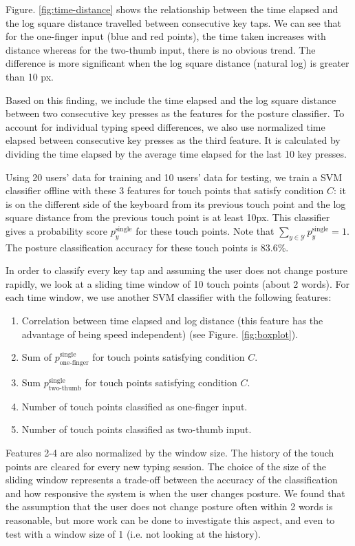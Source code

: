 \documentclass{sigchi}
\begin{document}
Figure. \ref{fig:time-distance} shows the relationship between the time elapsed 
and the log square distance travelled between consecutive key taps. We can
see that for the one-finger input (blue and red points), the time taken
increases with distance whereas for the two-thumb input, there is no obvious
trend. The difference is more significant when the log square distance (natural
log) is greater than 10 px.

Based on this finding, we include the time elapsed and the log square distance
between two consecutive key presses as the features for the posture classifier. 
To account for individual typing speed differences, we also use normalized time 
elapsed between consecutive key presses as the third feature. It is calculated 
by dividing the time elapsed by the average time elapsed for the last 10 key
presses.

Using 20 users’ data for training and 10 users’ data for testing, we train a SVM classifier offline with these 3 features for touch points that satisfy condition $C$: it is 
on the different side of the keyboard from its previous touch point and the log square distance from the previous touch point is at least 10px. This classifier gives a probability score $p_y^{\text{single}}$ for these touch points. Note that $\displaystyle\sum_{y \in \mathcal{Y}}p_y^{\text{single}} = 1$. The posture classification accuracy for these touch points is 83.6\%.
 
In order to classify every key tap and assuming the user does not change posture 
rapidly, we look at a sliding time window of 10 touch points (about 2 words). For 
each time window, we use another SVM classifier with the following features:
\begin{enumerate}
\item Correlation between time elapsed and log distance (this feature has the
advantage of being speed independent) (see Figure. \ref{fig:boxplot}).
\item Sum of $p_\text{one-finger}^{\text{single}}$ for touch points satisfying condition $C$.
\item Sum $p_\text{two-thumb}^{\text{single}}$ for touch points satisfying condition $C$.
\item Number of touch points classified as one-finger input.
\item Number of touch points classified as two-thumb input.
\end{enumerate}
Features 2-4 are also normalized by the window size. The history of the touch points are cleared for every new typing session.
The choice of the size of the sliding window represents a trade-off between the 
accuracy of the classification and how responsive the system is when the user
changes posture. We found that the assumption that the user does not change posture
often within 2 words is reasonable, but more work can be done to investigate this
aspect, and even to test with a window size of 1 (i.e. not 
looking at the history).
\end{document}
